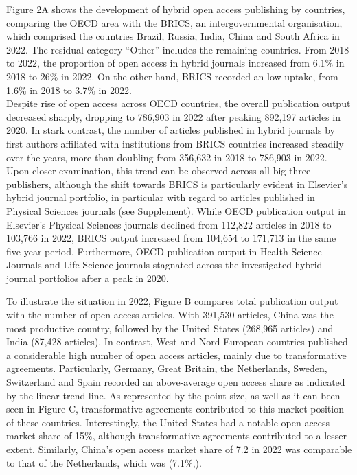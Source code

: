 \documentclass[a4paper,man,floatsintext,longtable,noextraspace,12pt]{apa6}
\begin{document}
Figure 2A shows the development of hybrid open access publishing by
countries, comparing the OECD area with the BRICS, an intergovernmental
organisation, which comprised the countries Brazil, Russia, India, China
and South Africa in 2022. The residual category ``Other'' includes the
remaining countries. From 2018 to 2022, the proportion of open access in
hybrid journals increased from 6.1\% in 2018 to 26\% in 2022. On the
other hand, BRICS recorded an low uptake, from 1.6\% in 2018 to 3.7\% in
2022.\\
Despite rise of open access across OECD countries, the overall
publication output decreased sharply, dropping to 786,903 in 2022 after
peaking 892,197 articles in 2020. In stark contrast, the number of
articles published in hybrid journals by first authors affiliated with
institutions from BRICS countries increased steadily over the years,
more than doubling from 356,632 in 2018 to 786,903 in 2022. Upon closer
examination, this trend can be observed across all big three publishers,
although the shift towards BRICS is particularly evident in Elsevier's
hybrid journal portfolio, in particular with regard to articles
published in Physical Sciences journals (see Supplement). While OECD
publication output in Elsevier's Physical Sciences journals declined
from 112,822 articles in 2018 to 103,766 in 2022, BRICS output increased
from 104,654 to 171,713 in the same five-year period. Furthermore, OECD
publication output in Health Science Journals and Life Science journals
stagnated across the investigated hybrid journal portfolios after a peak
in 2020.

To illustrate the situation in 2022, Figure B compares total publication
output with the number of open access articles. With 391,530 articles,
China was the most productive country, followed by the United States
(268,965 articles) and India (87,428 articles). In contrast, West and
Nord European countries published a considerable high number of open
access articles, mainly due to transformative agreements. Particularly,
Germany, Great Britain, the Netherlands, Sweden, Switzerland and Spain
recorded an above-average open access share as indicated by the linear
trend line. As represented by the point size, as well as it can been
seen in Figure C, transformative agreements contributed to this market
position of these countries. Interestingly, the United States had a
notable open access market share of 15\%, although transformative
agreements contributed to a lesser extent. Similarly, China's open
access market share of 7.2 in 2022 was comparable to that of the
Netherlands, which was (7.1\%,).
\end{document}
